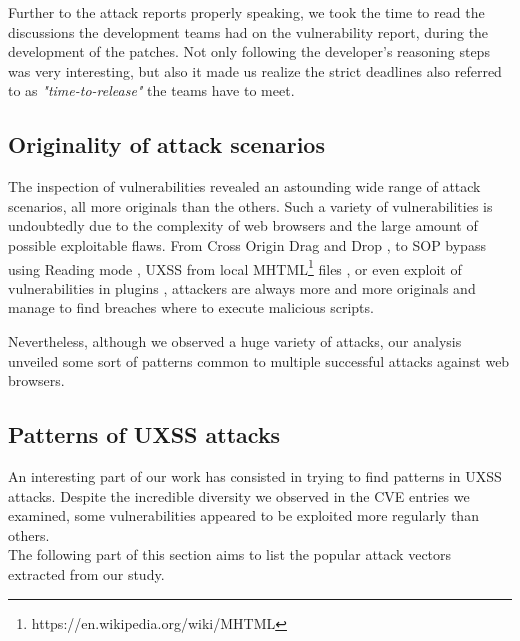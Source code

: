 \documentclass[journal]{IEEEtran}
\begin{document}
\medskip

Further to the attack reports properly speaking, we took the time to read the discussions the development teams had on the vulnerability report, during the development of the patches. Not only following the developer's reasoning steps was very interesting, but also it made us realize the strict deadlines also referred to as \emph{"time-to-release"} the teams have to meet.


\subsection{Originality of attack scenarios}

The inspection of vulnerabilities revealed an astounding wide range of attack scenarios, all more originals than the others. Such a variety of vulnerabilities is undoubtedly due to the complexity of web browsers and the large amount of possible exploitable flaws. From Cross Origin Drag and Drop \cite{CVE-2013-2849}, to SOP bypass using Reading mode \cite{edgeReadingModeUXSS}, UXSS from local MHTML\footnote{https://en.wikipedia.org/wiki/MHTML} files \cite{CVE-2014-1747}, or even exploit of vulnerabilities in plugins \cite{uxssPDF} \cite{uxssKeybase}, attackers are always more and more originals and manage to find breaches where to execute malicious scripts.

\medskip

Nevertheless, although we observed a huge variety of attacks, our analysis unveiled some sort of patterns common to multiple successful attacks against web browsers.

\subsection{Patterns of UXSS attacks}

An interesting part of our work has consisted in trying to find patterns in UXSS attacks. Despite the incredible diversity we observed in the CVE entries we examined, some vulnerabilities appeared to be exploited more regularly than others. \\
The following part of this section aims to list the popular attack vectors extracted from our study.

\medskip
\end{document}
